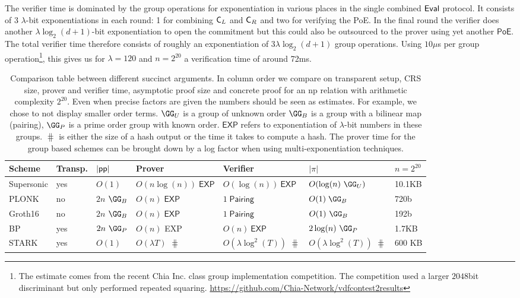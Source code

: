The verifier time is dominated by the group operations for exponentiation in various places in the single combined $\textsf{{Eval}}$ protocol. It consists of 3 $\lambda$-bit exponentiations in each round: 1 for combining $\mathsf{C}_L$ and $\mathsf{C}_R$ and two for verifying the \textsf{PoE}. In the final round the verifier does another $\lambda \log_2(d+1)$-bit exponentiation to open the commitment but this could also be outsourced to the prover using yet another $\textsf{PoE}$. The total verifier time therefore consists of roughly an exponentiation of $3 \lambda \log_2(d+1)$ group operations. 
Using $10\mu$s per group operation\footnote{The estimate comes from the recent Chia Inc. class group implementation competition. The competition used a larger $2048$bit discriminant but only performed repeated squaring. \url{https://github.com/Chia-Network/vdfcontest2results}}, this gives us for $\lambda=120$ and $n=2^{20}$ a verification time of around 72ms. 
\begin{table}[!htp]
\begin{small}
\begin{tabular}{l||l|l|l|l|l|l}
	Scheme & Transp. & $|\textsf{pp}|$  & Prover & Verifier & $|\pi|$& $n=2^{20}$ \\
	\hline
	\hline
    \textsf{Supersonic} & yes & $O(1)$ & $O( n \log(n) )\; \textsf{EXP}$ & $O(\log(n))~\textsf{EXP}$ & $O(\log(n) \ \GG_{U})$ & 10.1KB \\
    \textsf{PLONK} \cite{Plonk} & no & $2n$ $\GG_{B}$ & $O(n)\; \textsf{EXP}$  & $1\; \textsf{Pairing} $ & $O(1)\; \GG_{B}$ & 720b \\
        Groth16 \cite{EC:Groth16} & no & $2n$ $\GG_{B}$ & $O(n)\; \textsf{EXP}$  & $1\; \textsf{Pairing} $ & $O(1) \ \GG_{B}$ & 192b \\
       BP \cite{SP:BBBPWM18} & yes &$2 n \ \GG_{P}$& $O(n)$ \textsf{EXP}& $O(n) \ \textsf{EXP}$ &$2 \log(n) \ \GG_P$ & 1.7KB\\
       \textsf{STARK} & yes & $O(1)$ & $O(\lambda  T)$ $\hash$ & $O(\lambda \log^2(T))$ $\hash$ & $O(\lambda \log^2(T))$ $\hash$ & 600 KB
\end{tabular}

\caption{Comparison table between different succinct arguments. 
In column order we compare on transparent setup, CRS size, prover and verifier time, asymptotic proof size and concrete proof for an np relation with arithmetic complexity $2^{20}$.
Even when precise factors are given the numbers should be seen as  estimates. For example, we chose to not display smaller order terms. $\GG_U$ is a group of unknown order $\GG_{B}$ is a group with a bilinear map (pairing), $\GG_{P}$ is a prime order group with known order. $\textsf{EXP}$ refers to exponentiation of $\lambda$-bit numbers in these groups. $\hash$ is either the size of a hash output or the time it takes to compute a hash. 
The prover time for the group based schemes can be brought down by a log factor when using multi-exponentiation techniques.}
\label{tab:proofcomp}
\end{small}
\end{table}


